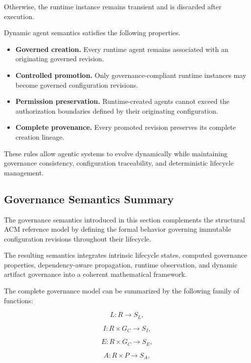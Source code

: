 \documentclass[10pt]{article}
\begin{document}
Otherwise, the runtime instance remains transient and is discarded after execution.

Dynamic agent semantics satisfies the following properties.

\begin{itemize}

\item \textbf{Governed creation.}
Every runtime agent remains associated with an originating governed revision.

\item \textbf{Controlled promotion.}
Only governance-compliant runtime instances may become governed configuration revisions.

\item \textbf{Permission preservation.}
Runtime-created agents cannot exceed the authorization boundaries defined by their originating configuration.

\item \textbf{Complete provenance.}
Every promoted revision preserves its complete creation lineage.

\end{itemize}

These rules allow agentic systems to evolve dynamically while maintaining governance consistency, configuration traceability, and deterministic lifecycle management.

\subsection{Governance Semantics Summary}
\label{sec:governance_summary}

The governance semantics introduced in this section complements the structural ACM reference model by defining the formal behavior governing immutable configuration revisions throughout their lifecycle.

The resulting semantics integrates intrinsic lifecycle states, computed governance properties, dependency-aware propagation, runtime observation, and dynamic artifact governance into a coherent mathematical framework.

The complete governance model can be summarized by the following family of functions:

\[
L:R\rightarrow S_L,
\]

\[
I:R\times G_C\rightarrow S_I,
\]

\[
E:R\times G_C\rightarrow S_E,
\]

\[
A:R\times P\rightarrow S_A,
\]
\end{document}
